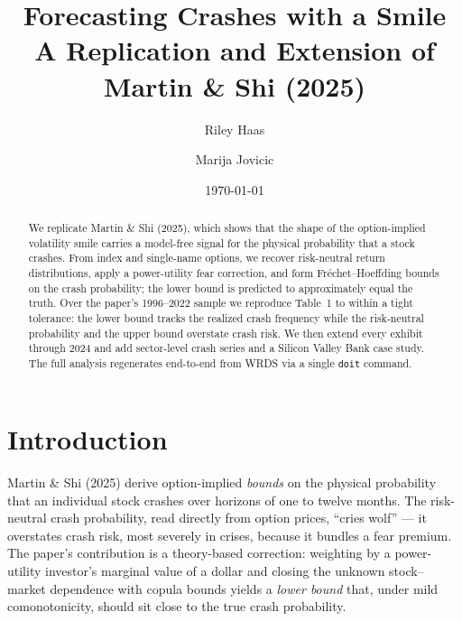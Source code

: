 \documentclass[12pt]{article}
\begin{document}
\title{
Forecasting Crashes with a Smile\\
{\large A Replication and Extension of Martin \& Shi (2025)}
}
\author{Riley Haas \and Marija Jovicic}
\date{\today}

\begin{titlepage}
\maketitle

\doublespacing
\begin{abstract}
We replicate Martin \& Shi (2025), which shows that the shape of the
option-implied volatility smile carries a model-free signal for the physical
probability that a stock crashes. From index and single-name options, we recover
risk-neutral return distributions, apply a power-utility fear correction, and
form Fr\'echet--Hoeffding bounds on the crash probability; the lower bound is
predicted to approximately equal the truth. Over the paper's 1996--2022 sample we
reproduce Table~1 to within a tight tolerance: the lower bound tracks the realized
crash frequency while the risk-neutral probability and the upper bound overstate
crash risk. We then extend every exhibit through 2024 and add sector-level crash
series and a Silicon Valley Bank case study. The full analysis regenerates
end-to-end from WRDS via a single \texttt{doit} command.
\end{abstract}
\end{titlepage}

\singlespacing

\section{Introduction}
Martin \& Shi (2025) derive option-implied \emph{bounds} on the physical
probability that an individual stock crashes over horizons of one to twelve
months. The risk-neutral crash probability, read directly from option prices,
``cries wolf'' --- it overstates crash risk, most severely in crises, because it
bundles a fear premium. The paper's contribution is a theory-based correction:
weighting by a power-utility investor's marginal value of a dollar and closing the
unknown stock--market dependence with copula bounds yields a \emph{lower bound}
that, under mild comonotonicity, should sit close to the true crash probability.
\end{document}
